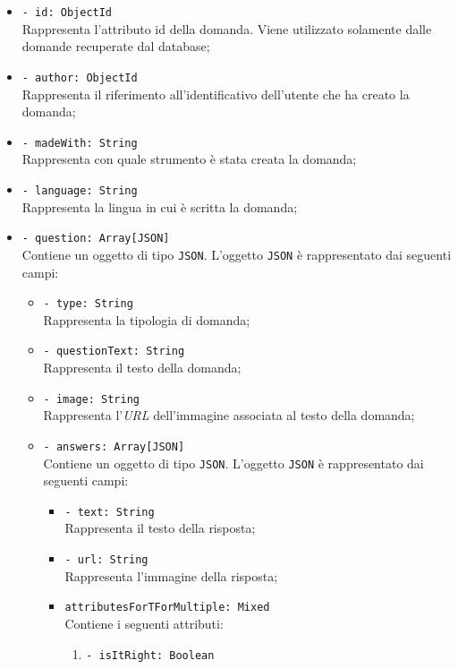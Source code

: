 \begin{itemize}
			\begin{itemize}
				\item \texttt{- id: ObjectId}\\
				Rappresenta l'attributo id della domanda. Viene utilizzato solamente dalle domande recuperate dal database;
				\item \texttt{- author: ObjectId}\\
				Rappresenta il riferimento all'identificativo dell'utente che ha creato la domanda;
				\item \texttt{- madeWith: String}\\ 
				Rappresenta con quale strumento è stata creata la domanda;
				\item \texttt{- language: String}\\
				Rappresenta la lingua in cui è scritta la domanda; 
				\item \texttt{- question: Array[JSON]}\\ 
				Contiene un oggetto di tipo \texttt{JSON}. L'oggetto \texttt{JSON} è rappresentato dai seguenti campi:
				\begin{itemize}
					\item \texttt{- type: String}\\
					Rappresenta la tipologia di domanda;
					\item \texttt{- questionText: String}\\ 
					Rappresenta il testo della domanda; 
					\item \texttt{- image: String}\\
					Rappresenta l'\textit{URL} dell'immagine associata al testo della domanda; 
					\item \texttt{- answers: Array[JSON]}\\ 
					Contiene un oggetto di tipo \texttt{JSON}. L'oggetto \texttt{JSON} è rappresentato dai seguenti campi:
					\begin{itemize}	 				  
						\item \texttt{- text: String}\\
						Rappresenta il testo della risposta;
						\item \texttt{- url: String}\\
						Rappresenta l'immagine della risposta;
						\item \texttt{attributesForTForMultiple: Mixed}\\
						Contiene i seguenti attributi:
						\begin{enumerate}
							\item \texttt{- isItRight: Boolean}\\

\end{enumerate}
\end{itemize}
\end{itemize}
\end{itemize}
\end{itemize}

